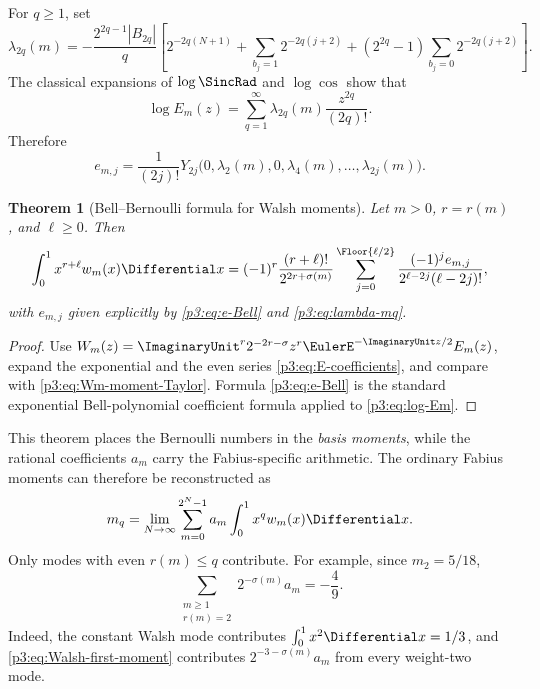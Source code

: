 \documentclass[11pt]{article}
\newtheorem{theorem}{Theorem}[section]
\theoremstyle{definition}
\theoremstyle{remark}
\begin{document}
For $q\ge1$, set
\begin{equation}\label{p3:eq:lambda-mq}
 \lambda_{2q}(m)
 =-\frac{2^{2q-1}|B_{2q}|}{q}
 \left[
  2^{-2q(N+1)}
  +\sum_{b_j=1}2^{-2q(j+2)}
  +(2^{2q}-1)\sum_{b_j=0}2^{-2q(j+2)}
 \right].
\end{equation}
The classical expansions of $\log\SincRad$ and $\log\cos$ show that
\begin{equation}\label{p3:eq:log-Em}
 \log E_m(z)=\sum_{q=1}^\infty
 \lambda_{2q}(m)\frac{z^{2q}}{(2q)!}.
\end{equation}
Therefore
\begin{equation}\label{p3:eq:e-Bell}
 e_{m,j}=\frac1{(2j)!}
 Y_{2j}\bigl(0,\lambda_2(m),0,\lambda_4(m),\ldots,
              \lambda_{2j}(m)\bigr).
\end{equation}

\begin{theorem}[Bell--Bernoulli formula for Walsh moments]
\label{p3:thm:Walsh-Bell-moments}
Let $m>0$, $r=r(m)$, and $\ell\ge0$.  Then
\begin{equation}\label{p3:eq:Walsh-higher-moments}
 \int_0^1x^{r+\ell}w_m(x)\Differential x
 =(-1)^r\frac{(r+\ell)!}{2^{2r+\sigma(m)}}
 \sum_{j=0}^{\Floor{\ell/2}}
 \frac{(-1)^je_{m,j}}
      {2^{\ell-2j}(\ell-2j)!},
\end{equation}
with $e_{m,j}$ given explicitly by \eqref{p3:eq:e-Bell} and
\eqref{p3:eq:lambda-mq}.
\end{theorem}

\begin{proof}
Use
$W_m(z)=\ImaginaryUnit^r2^{-2r-\sigma}z^r\EulerE^{-\ImaginaryUnit z/2}E_m(z)$,
expand the exponential and the even series \eqref{p3:eq:E-coefficients}, and
compare with \eqref{p3:eq:Wm-moment-Taylor}.  Formula \eqref{p3:eq:e-Bell} is the
standard exponential Bell-polynomial coefficient formula applied to
\eqref{p3:eq:log-Em}.
\end{proof}

This theorem places the Bernoulli numbers in the \emph{basis moments}, while
the rational coefficients $a_m$ carry the Fabius-specific arithmetic.  The
ordinary Fabius moments can therefore be reconstructed as
\begin{equation}\label{p3:eq:Fabius-moment-Walsh}
 m_q=\lim_{N\to\infty}
 \sum_{m=0}^{2^N-1}a_m\int_0^1x^qw_m(x)\Differential x.
\end{equation}
Only modes with even $r(m)\le q$ contribute.  For example, since
$m_2=5/18$,
\begin{equation}\label{p3:eq:weight-two-sum-rule}
 \sum_{\substack{m\ge1\\r(m)=2}}
 2^{-\sigma(m)}a_m=-\frac49.
\end{equation}
Indeed, the constant Walsh mode contributes $\int_0^1x^2\Differential x=1/3$, and
\eqref{p3:eq:Walsh-first-moment} contributes
$2^{-3-\sigma(m)}a_m$ from every weight-two mode.
\end{document}

